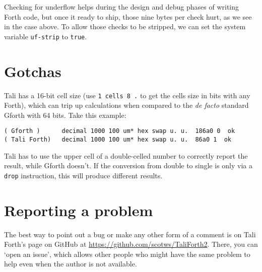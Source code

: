 Checking for underflow helps during the design and debug phases of writing Forth
code, but once it ready to ship, those nine bytes per check hurt, as we see in
the case above. To allow those checks to be stripped, we can set the system
variable \texttt{uf-strip} to \texttt{true}.





\section{Gotchas}

Tali has a 16-bit cell size (use \texttt{1 cells 8 \* .} to get the cells size in
bits with any Forth), which can trip up calculations when compared to the
\textit{de facto} standard Gforth with 64 bits. Take this example:

\begin{lstlisting}[frame=lines]
( Gforth )      decimal 1000 100 um* hex swap u. u.  186a0 0  ok
( Tali Forth)   decimal 1000 100 um* hex swap u. u.  86a0 1  ok
\end{lstlisting}

\noindent Tali has to use the upper cell of a double-celled
number to correctly report the result, while Gforth doesn't. If the conversion
from double to single is only via a \texttt{drop} instruction, this will produce
different results.



\section{Reporting a problem}

The best way to point out a bug or make any other form of a comment is on Tali
Forth's page on GitHub at
\href{https://github.com/scotws/TaliForth2}{https://github.com/scotws/TaliForth2}.
There, you can `open an issue', which allows other people who might have the
same problem to help even when the author is not available.



